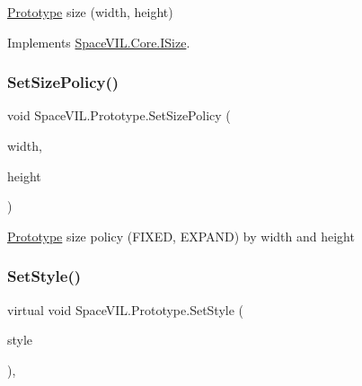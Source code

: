 \mbox{\hyperlink{class_space_v_i_l_1_1_prototype}{Prototype}} size (width, height) 



Implements \mbox{\hyperlink{interface_space_v_i_l_1_1_core_1_1_i_size}{Space\+V\+I\+L.\+Core.\+I\+Size}}.

\mbox{\label{class_space_v_i_l_1_1_prototype_aef3665193fee08b031ad7401dafc8674}} 
\subsubsection{\texorpdfstring{Set\+Size\+Policy()}{SetSizePolicy()}}
{\footnotesize\ttfamily void Space\+V\+I\+L.\+Prototype.\+Set\+Size\+Policy (\begin{DoxyParamCaption}\item[{Size\+Policy}]{width,  }\item[{Size\+Policy}]{height }\end{DoxyParamCaption})\hspace{0.3cm}{\ttfamily [inline]}}



\mbox{\hyperlink{class_space_v_i_l_1_1_prototype}{Prototype}} size policy (F\+I\+X\+ED, E\+X\+P\+A\+ND) by width and height 

\mbox{\label{class_space_v_i_l_1_1_prototype_ae96644a6ace490afb376fb542161e541}} 
\subsubsection{\texorpdfstring{Set\+Style()}{SetStyle()}}
{\footnotesize\ttfamily virtual void Space\+V\+I\+L.\+Prototype.\+Set\+Style (\begin{DoxyParamCaption}\item[{\mbox{\hyperlink{class_space_v_i_l_1_1_decorations_1_1_style}{Style}}}]{style }\end{DoxyParamCaption})\hspace{0.3cm}{\ttfamily [inline]}, {\ttfamily [virtual]}}



